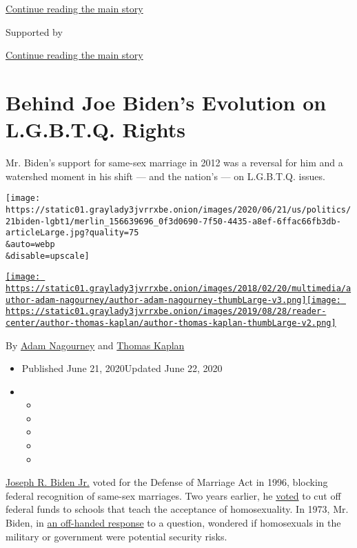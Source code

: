 \protect\hyperlink{after-top}{Continue reading the main story}

Supported by

\protect\hyperlink{after-sponsor}{Continue reading the main story}

\hypertarget{behind-joe-bidens-evolution-on-lgbtq-rights}{%
\section{Behind Joe Biden's Evolution on L.G.B.T.Q.
Rights}\label{behind-joe-bidens-evolution-on-lgbtq-rights}}

Mr. Biden's support for same-sex marriage in 2012 was a reversal for him
and a watershed moment in his shift --- and the nation's --- on
L.G.B.T.Q. issues.

\texttt{[image: https://static01.graylady3jvrrxbe.onion/images/2020/06/21/us/politics/21biden-lgbt1/merlin\_156639696\_0f3d0690-7f50-4435-a8ef-6ffac66fb3db-articleLarge.jpg?quality=75\\\&auto=webp\\\&disable=upscale]}

\href{https://www.nytimes3xbfgragh.onion/by/adam-nagourney}{\texttt{[image: https://static01.graylady3jvrrxbe.onion/images/2018/02/20/multimedia/author-adam-nagourney/author-adam-nagourney-thumbLarge-v3.png]}}\href{https://www.nytimes3xbfgragh.onion/by/thomas-kaplan}{\texttt{[image: https://static01.graylady3jvrrxbe.onion/images/2019/08/28/reader-center/author-thomas-kaplan/author-thomas-kaplan-thumbLarge-v2.png]}}

By \href{https://www.nytimes3xbfgragh.onion/by/adam-nagourney}{Adam
Nagourney} and
\href{https://www.nytimes3xbfgragh.onion/by/thomas-kaplan}{Thomas
Kaplan}

\begin{itemize}
\item
  Published June 21, 2020Updated June 22, 2020
\item
  \begin{itemize}
  \item
  \item
  \item
  \item
  \item
  \end{itemize}
\end{itemize}

\href{https://www.nytimes3xbfgragh.onion/interactive/2020/us/elections/joe-biden.html}{Joseph
R. Biden Jr.} voted for the Defense of Marriage Act in 1996, blocking
federal recognition of same-sex marriages. Two years earlier, he
\href{https://www.nytimes3xbfgragh.onion/1994/08/02/us/senate-backs-cuts-for-schools-that-endorse-homosexuality.html}{voted}
to cut off federal funds to schools that teach the acceptance of
homosexuality. In 1973, Mr. Biden, in
\href{https://www.newspapers.com/clip/53510488/the-morning-news/}{an
off-handed response} to a question, wondered if homosexuals in the
military or government were potential security risks.

